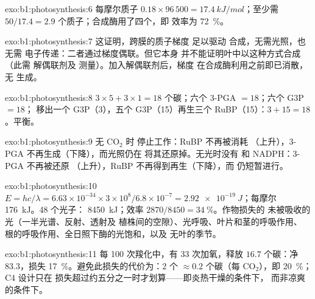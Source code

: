 \begin{solution}{exo:b1:photosynthesis:6}
每摩尔质子 $0.18\times 96\,500 = \qty{17.4}{kJ/mol}$；至少需 $50/17.4 = 2.9$
个质子；合成酶用了四个，即
效率为 \qty{72}{\%}。
\end{solution}

\begin{solution}{exo:b1:photosynthesis:7}
这证明，跨膜的质子梯度
足以驱动  合成，无需光照，也无需
电子传递：二者通过梯度偶联。但它本身
并不能证明叶中以这种方式合成 （此需
解偶联剂及  测量）。加入解偶联剂后，梯度
在合成酶利用之前即已消散，无  生成。
\end{solution}

\begin{solution}{exo:b1:photosynthesis:8}
$3\times 5 + 3\times 1 = 18$ 个碳；六个 3-PGA $= 18$；六个 G3P $= 18$；
移出一个 G3P（3），五个 G3P（15）再生三个 RuBP（15）：$3 +
15 = 18$。平衡。
\end{solution}

\begin{solution}{exo:b1:photosynthesis:9}
无 $\mathrm{CO_2}$ 时  停止工作：RuBP 不再被消耗
（上升），3-PGA 不再生成（下降），而光照仍在
将其还原掉。无光时没有  和 NADPH：3-PGA 不再被还原
（上升），RuBP 不再得到再生（下降），而
仍短暂进行。
\end{solution}

\begin{solution}{exo:b1:photosynthesis:10}
$E = hc/\lambda = 6.63\times 10^{-34}\times 3\times 10^8/6.8\times
10^{-7} = \qty{2.92e-19}{J}$；每摩尔 \qty{176}{kJ}。48 个光子：
\qty{8450}{kJ}；效率 $2870/8450 = \qty{34}{\%}$。作物损失的
未被吸收的光（一半光谱、反射、透射及
植株间的空隙）、光呼吸、叶片和茎的呼吸作用、
根的呼吸作用、全日照下酶的光饱和，以及
无叶的季节。
\end{solution}

\begin{solution}{exo:b1:photosynthesis:11}
每 100 次羧化中，有 33 次加氧，释放 $16.7$ 个碳：净
$83.3$，损失 \qty{17}{\%}。避免此损失的代价为：2 个  $\approx
0.2$ 个碳（每 $\mathrm{CO_2}$），即 \qty{20}{\%}；C4 设计只在
损失超过约五分之一时才划算——即炎热干燥的条件下，
而非凉爽的条件下。
\end{solution}

